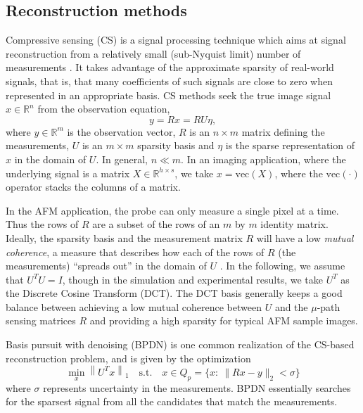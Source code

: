 \documentclass[twocolumn,oneside]{IEEEtran/IEEEtran}
\begin{document}
\subsection{Reconstruction methods}
\label{sec:reconstructionMethods}
Compressive sensing (CS) is a signal processing technique which aims
at signal reconstruction from a relatively small (sub-Nyquist limit)
number of measurements \cite{carmi2014compressive}. It takes advantage
of the approximate sparsity of real-world signals, that is, that many
coefficients of such signals are close to zero when represented in an
appropriate basis. CS methods seek the true image signal
$x\in\mathbb{R}^n$ from the observation equation,
\begin{equation}\label{op:observation}
  y = R x = RU\eta,
\end{equation}
\noindent where $y\in\mathbb{R}^m$ is the observation vector, $R$ is
an $n\times m$ matrix defining the measurements, $U$ is an $m\times m$
sparsity basis and $\eta$ is the sparse representation of $x$ in the
domain of $U$. In general, $n\ll m$. In an imaging application, where
the underlying signal is a matrix $X\in\mathbb{R}^{h\times s}$, we
take $x=\text{vec}(X)$, where the $\text{vec}(\cdot)$ operator stacks
the columns of a matrix.

	
In the AFM application, the probe can only measure a single pixel at a
time. Thus the rows of $R$ are a subset of the rows of an $m$ by $m$
identity matrix. Ideally, the sparsity basis and the measurement
matrix $R$ will have a low \textit{mutual coherence}, a measure that
describes how each of the rows of $R$ (the measurements) ``spreads
out'' in the domain of $U$ \cite{candes2007sparsity}. In the
following, we assume that $U^TU=I$, though in the simulation and
experimental results, we take $U^T$ as the Discrete Cosine Transform
(DCT). The DCT basis generally keeps a good balance between achieving
a low mutual coherence between $U$ and the $\mu$-path sensing matrices
$R$ and providing a high sparsity for typical AFM sample images.
	
Basis pursuit with denoising (BPDN) is one common realization of the
CS-based reconstruction problem, and is given by the optimization
\begin{equation}
  \min_{x} \left \| U^Tx \right \|_1 \quad
  \text{s.t.}\quad x\in Q_p = \{x:~\|Rx - y\|_2 < \sigma\} \label{op:bp}
\end{equation}
where $\sigma$ represents uncertainty in the measurements. BPDN
essentially searches for the sparsest signal from all the candidates
that match the measurements.
\end{document}
